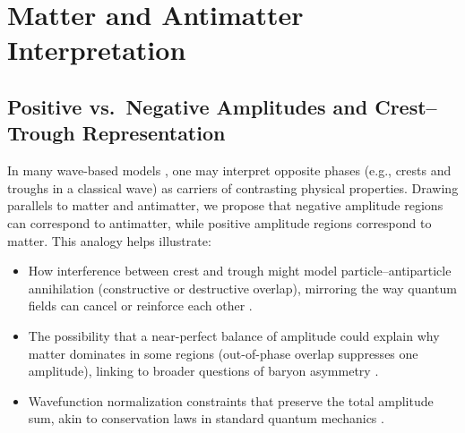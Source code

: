 \documentclass{article}
\begin{document}
\section{Matter and Antimatter Interpretation}
\label{sec:matter-antimatter}

\subsection{Positive vs.\ Negative Amplitudes and Crest--Trough Representation}
\label{subsec:crest-trough}
In many wave-based models \cite{griffiths2005introduction, feynmanlectures}, 
one may interpret opposite phases (e.g., crests and troughs in a classical wave) 
as carriers of contrasting physical properties. Drawing parallels to matter 
and antimatter, we propose that negative amplitude regions can correspond 
to antimatter, while positive amplitude regions correspond to matter. 
This analogy helps illustrate:
\begin{itemize}
  \item How interference between crest and trough might model 
        particle--antiparticle annihilation (constructive or destructive overlap), 
        mirroring the way quantum fields can cancel or reinforce each other 
        \cite{Dirac1928, Sakharov1967}.
  \item The possibility that a near-perfect balance of amplitude could explain 
        why matter dominates in some regions (out-of-phase overlap suppresses 
        one amplitude), linking to broader questions of baryon asymmetry 
        \cite{Sakharov1967, penrose2004}.
  \item Wavefunction normalization constraints that preserve the total amplitude 
        sum, akin to conservation laws in standard quantum mechanics 
        \cite{vonneumann1932, husimi1940some}.
\end{itemize}
\end{document}
